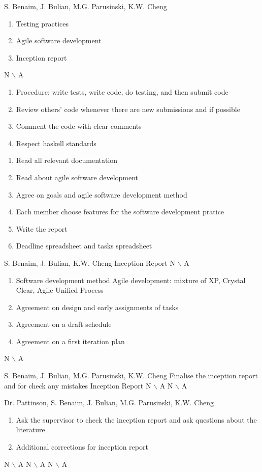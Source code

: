 %
{S. Benaim, J. Bulian, M.G. Parusinski, K.W. Cheng}%
{ \begin{enumerate} 
\item Testing practices
\item Agile software development
\item Inception report
\end{enumerate} }%
{ N $\backslash$ A}%
{\begin{enumerate}
\item Procedure: write tests, write code, do testing, and then submit code
\item Review others' code whenever there are new submissions and if possible
\item Comment the code with clear comments
\item Respect haskell standards
\end{enumerate}}
{ \begin{enumerate}
\item Read all relevant documentation
\item Read about agile software development
\item Agree on goals and agile software development method
\item Each member choose features for the software development pratice
\item Write the report
\item Deadline spreadsheet and tasks spreadsheet
\end{enumerate}}%

%
{S. Benaim, J. Bulian, K.W. Cheng}%
{Inception Report}%
{ N $\backslash$ A}%
{\begin{enumerate}
\item Software development method Agile development: mixture of XP, Crystal Clear, Agile Unified Process
\item Agreement on design and early assignments of tasks
\item Agreement on a draft schedule
\item Agreement on a first iteration plan
\end{enumerate}}
{N $\backslash$ A}%

%
{S. Benaim, J. Bulian, M.G. Parusinski, K.W. Cheng}%
{Finalise the inception report and for check any mistakes }%
{Inception Report}%
{N $\backslash$ A}
{N $\backslash$ A}%

%
{Dr. Pattinson, S. Benaim, J. Bulian, M.G. Parusinski, K.W. Cheng}%
{ \begin{enumerate} 
\item Ask the supervisor to check the inception report and ask questions about the literature
\item Additional corrections for inception report
\end{enumerate} }%
{ N $\backslash$ A}%
{N $\backslash$ A}
{N $\backslash$ A}%

